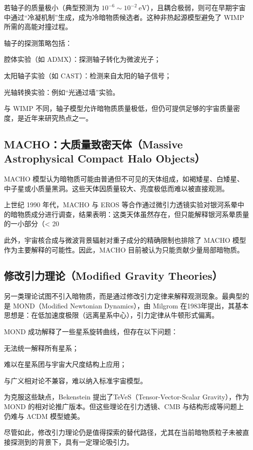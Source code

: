 若轴子的质量极小（典型预测为 $10^{-6} \sim 10^{-2}~ \mathrm{eV} $），且耦合极弱，则可在早期宇宙中通过“冷凝机制”生成，成为冷暗物质候选者。这种非热起源模型避免了 WIMP 所需的高能对撞过程。

轴子的探测策略包括：

腔体实验（如 ADMX）：探测轴子转化为微波光子；

太阳轴子实验（如 CAST）：检测来自太阳的轴子信号；

光轴转换实验：例如“光通过墙”实验。

与 WIMP 不同，轴子模型允许暗物质质量极低，但仍可提供足够的宇宙质量密度，是近年来研究热点之一。

\subsection{MACHO：大质量致密天体（Massive Astrophysical Compact Halo Objects）}

MACHO 模型认为暗物质可能由普通但不可见的天体组成，如褐矮星、白矮星、中子星或小质量黑洞。这些天体因质量较大、亮度极低而难以被直接观测。

上世纪 1990 年代，MACHO 与 EROS 等合作通过微引力透镜实验对银河系晕中的暗物质成分进行调查，结果表明：这类天体虽然存在，但只能解释银河系晕质量的一小部分（< 20%

此外，宇宙核合成与微波背景辐射对重子成分的精确限制也排除了 MACHO 模型作为主要解释的可能性。因此，MACHO 目前被认为只能贡献少量局部暗物质。

\subsection{修改引力理论（Modified Gravity Theories）}

另一类理论试图不引入暗物质，而是通过修改引力定律来解释观测现象。最典型的是 MOND（Modified Newtonian Dynamics），由 Milgrom 在1983年提出，其基本思想是：在低加速度极限（远离星系中心），引力定律从牛顿形式偏离。

MOND 成功解释了一些星系旋转曲线，但存在以下问题：

无法统一解释所有星系；

难以在星系团与宇宙大尺度结构上应用；

与广义相对论不兼容，难以纳入标准宇宙模型。

为克服这些缺点，Bekenstein 提出了TeVeS（Tensor-Vector-Scalar Gravity），作为 MOND 的相对论推广版本。但这些理论在引力透镜、CMB 与结构形成等问题上仍难与 ΛCDM 模型媲美。

尽管如此，修改引力理论仍是值得探索的替代路径，尤其在当前暗物质粒子未被直接探测到的背景下，具有一定理论吸引力。

\newpage